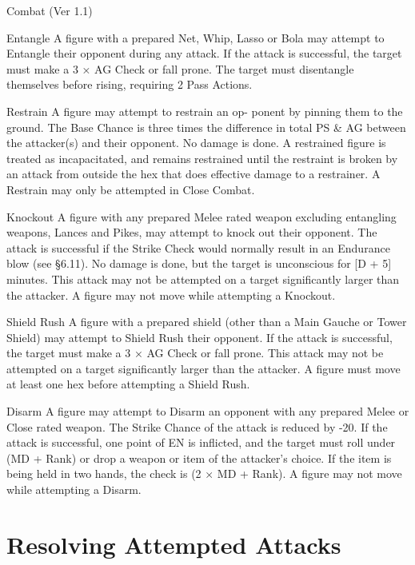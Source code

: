 \begin{Chapter}{Combat (Ver 1.1)}
\begin{Description}
\item[Entangle] A figure with a prepared Net, Whip, Lasso or Bola may
  attempt to Entangle their opponent during any attack.  If the attack
  is successful, the target must make a 3 × AG Check or fall prone.
  The target must disentangle themselves before rising, requiring 2
  Pass Actions.

\item[Restrain] A figure may attempt to restrain an op- ponent by
  pinning them to the ground.  The Base Chance is three times the
  difference in total PS \& AG between the attacker(s) and their
  opponent. No damage is done.  A restrained figure is treated as
  incapacitated, and remains restrained until the restraint is broken
  by an attack from outside the hex that does effective damage to a
  restrainer.  A Restrain may only be attempted in Close Combat.

\item[Knockout] A figure with any prepared Melee rated weapon
  excluding entangling weapons, Lances and Pikes, may attempt to knock
  out their opponent.  The attack is successful if the Strike Check
  would normally result in an Endurance blow (see §6.11).  No damage
  is done, but the target is unconscious for [D + 5] minutes.  This
  attack may not be attempted on a target significantly larger than
  the attacker.  A figure may not move while attempting a Knockout.

\item[Shield Rush] A figure with a prepared shield (other than a Main
  Gauche or Tower Shield) may attempt to Shield Rush their
  opponent. If the attack is successful, the target must make a 3 × AG
  Check or fall prone.  This attack may not be attempted on a target
  significantly larger than the attacker.  A figure must move at least
  one hex before attempting a Shield Rush.

\item[Disarm] A figure may attempt to Disarm an opponent with any
  prepared Melee or Close rated weapon. The Strike Chance of the
  attack is reduced by -20. If the attack is successful, one point of
  EN is inflicted, and the target must roll under (MD + Rank) or drop
  a weapon or item of the attacker’s choice.  If the item is being
  held in two hands, the check is (2 × MD + Rank). A figure may not
  move while attempting a Disarm.

\end{Description}

\section{Resolving Attempted Attacks}


\end{Chapter}
